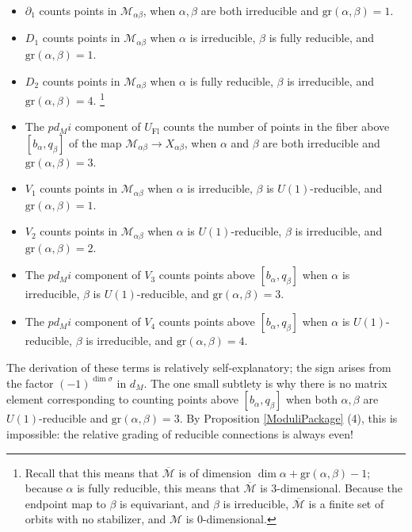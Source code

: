 \documentclass{memo-l}
\theoremstyle{definition}
\theoremstyle{remark}
\numberwithin{section}{chapter}
\numberwithin{equation}{chapter}
\begin{document}
\begin{itemize}
    \item $\partial_1$ counts points in $\mathcal M_{\alpha\beta}$, when $\alpha, \beta$ are both irreducible and $\text{gr}(\alpha, \beta) = 1$.
    \item $D_1$ counts points in $\mathcal M_{\alpha\beta}$ when $\alpha$ is irreducible, $\beta$ is fully reducible, and $\text{gr}(\alpha, \beta) = 1$.
    \item $D_2$ counts points in $\mathcal M_{\alpha\beta}$ when $\alpha$ is fully reducible, $\beta$ is irreducible, and $\text{gr}(\alpha, \beta) = 4$. \footnote{Recall that this means that $\overline{\mathcal M}$ is of dimension $\dim \alpha + \text{gr}(\alpha, \beta) - 1$; because $\alpha$ is fully reducible, this means that $\overline{\mathcal M}$ is 3-dimensional. Because the endpoint map to $\beta$ is equivariant, and $\beta$ is irreducible, $\overline{\mathcal M}$ is a finite set of orbits with no stabilizer, and $\mathcal M$ is 0-dimensional.} 
    \item The $p d_M i$ component of $U_\text{Fl}$ counts the number of points in the fiber above $[b_\alpha, q_\beta]$ of the map $\mathcal M_{\alpha\beta} \to X_{\alpha \beta}$, when $\alpha$ and $\beta$ are both irreducible and $\text{gr}(\alpha, \beta) = 3$. 
    \item $V_1$ counts points in $\mathcal M_{\alpha\beta}$ when $\alpha$ is irreducible, $\beta$ is $U(1)$-reducible, and $\text{gr}(\alpha, \beta) = 1$.
    \item $V_2$ counts points in $\mathcal M_{\alpha\beta}$ when $\alpha$ is $U(1)$-reducible, $\beta$ is irreducible, and $\text{gr}(\alpha, \beta) = 2$.
    \item The $p d_M i$ component of $V_3$ counts points above $[b_\alpha, q_\beta]$ when $\alpha$ is irreducible, $\beta$ is $U(1)$-reducible, and $\text{gr}(\alpha, \beta) = 3$.
    \item The $p d_M i$ component of $V_4$ counts points above $[b_\alpha, q_\beta]$ when $\alpha$ is $U(1)$-reducible, $\beta$ is irreducible, and $\text{gr}(\alpha, \beta) = 4$.
\end{itemize}

The derivation of these terms is relatively self-explanatory; the sign arises from the factor $(-1)^{\dim \sigma}$ in $d_M$. The one small subtlety is why there is no matrix element corresponding to counting points above $[b_\alpha, q_\beta]$ when both $\alpha, \beta$ are $U(1)$-reducible and $\text{gr}(\alpha, \beta) = 3$. By Proposition \ref{ModuliPackage} (4), this is impossible: the relative grading of reducible connections is always even!\\
\end{document}
